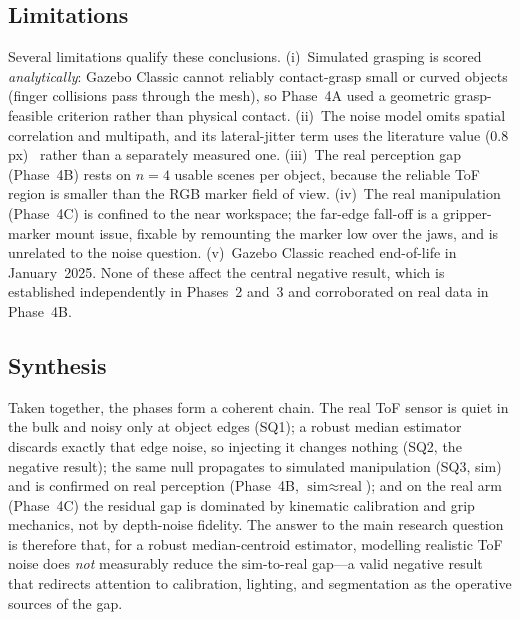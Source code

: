 \subsection{Limitations}
\label{sec:disc-limits}
Several limitations qualify these conclusions. (i)~Simulated grasping is scored
\emph{analytically}: Gazebo Classic cannot reliably contact-grasp small or
curved objects (finger collisions pass through the mesh), so Phase~4A used a
geometric grasp-feasible criterion rather than physical contact. (ii)~The noise
model omits spatial correlation and multipath, and its lateral-jitter term uses
the literature value ($0.8$\,px)~\cite{nguyen2012modeling} rather than a
separately measured one. (iii)~The real perception gap (Phase~4B) rests on
$n=4$ usable scenes per object, because the reliable ToF region is smaller than
the RGB marker field of view. (iv)~The real manipulation (Phase~4C) is confined
to the near workspace; the far-edge fall-off is a gripper-marker mount issue,
fixable by remounting the marker low over the jaws, and is unrelated to the
noise question. (v)~Gazebo Classic reached end-of-life in January~2025. None of
these affect the central negative result, which is established independently in
Phases~2 and~3 and corroborated on real data in Phase~4B.

\subsection{Synthesis}
\label{sec:disc-synthesis}
Taken together, the phases form a coherent chain. The real ToF sensor is quiet
in the bulk and noisy only at object edges (SQ1); a robust median estimator
discards exactly that edge noise, so injecting it changes nothing (SQ2, the
negative result); the same null propagates to simulated manipulation (SQ3, sim)
and is confirmed on real perception (Phase~4B, $\text{sim}\approx\text{real}$);
and on the real arm (Phase~4C) the residual gap is dominated by kinematic
calibration and grip mechanics, not by depth-noise fidelity. The answer to the
main research question is therefore that, for a robust median-centroid
estimator, modelling realistic ToF noise does \emph{not} measurably reduce the
sim-to-real gap---a valid negative result that redirects attention to
calibration, lighting, and segmentation as the operative sources of the gap.
